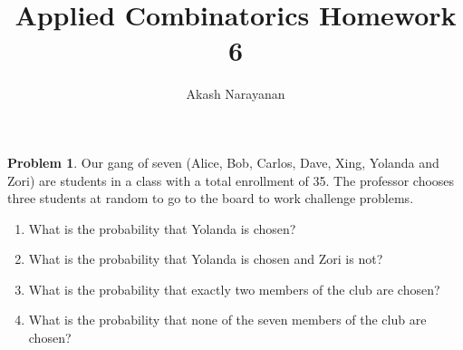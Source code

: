 \documentclass[12pt]{article}
\title{Applied Combinatorics Homework 6}
\author{Akash Narayanan}
\newcounter{chapternumber}
\theoremstyle{definition}
\newtheorem{problem-internal}{Problem}[chapternumber]
\newenvironment{problem}{
  \medskip
  \begin{problem-internal}
}{
\end{problem-internal}
}
\begin{document}
  \maketitle

  \setcounter{chapternumber}{10}
  \begin{problem}
    Our gang of seven (Alice, Bob, Carlos, Dave, Xing, Yolanda and Zori) are students in a class with a total enrollment of 35. The professor chooses three students at random to go to the board to work challenge problems.
    \begin{enumerate}[label={\alph*.}]
      \item What is the probability that Yolanda is chosen?
      \item What is the probability that Yolanda is chosen and Zori is not?
      \item What is the probability that exactly two members of the club are chosen?
      \item What is the probability that none of the seven members of the club are chosen?
    \end{enumerate}
  \end{problem}
\end{document}
